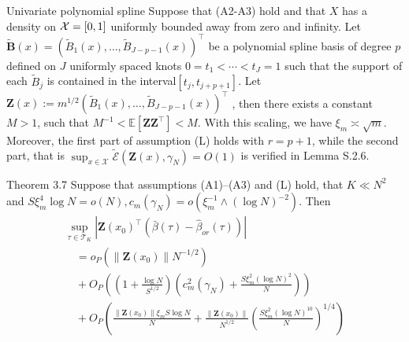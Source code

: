 \documentclass[11pt]{beamer}
\begin{document}
\begin{frame}{Univariate polynomial spline}
Suppose that (A2-A3) hold and that $X$ has a density on $\mathcal{X}=[0,1]$ uniformly bounded away from zero
and infinity. Let $\tilde{\mathbf{B}}(x)=\left(\widetilde{B}_{1}(x), \ldots, \widetilde{B}_{J-p-1}(x)\right)^{\top}$  be a polynomial spline basis
of degree $p$ defined on $J$ uniformly spaced knots $0=t_{1}<\cdots<t_{J}=1$ such
that the support of each $\tilde{B}_j$ is contained in the interval$[t_j,t_{j+p+1}]$. Let $\mathbf{Z}(x):=m^{1 / 2}\left(\widetilde{B}_{1}(x), \ldots, \widetilde{B}_{J-p-1}(x)\right)^{\top}$ , then there exists a constant $M>1$, such that
$M^{-1}<\mathbb{E}\left[\mathbf{Z Z}^{\top}\right]<M$. With this scaling, we have $\xi_{m} \asymp \sqrt{m}$. Moreover, the first part of assumption (L) holds
with $r=p+1$, while the second part, that is $\sup _{x \in \mathcal{X}} \widetilde{\mathcal{E}}\left(\mathbf{Z}(x), \gamma_{N}\right)=O(1)$ is verified in Lemma S.2.6.

\end{frame}


\begin{frame}{Theorem 3.7}
Suppose that assumptions (A1)–(A3) and (L) hold, that $K\ll N^2$ and $S \xi_{m}^{4} \log N=o(N), c_{m}\left(\gamma_{N}\right)=o\left(\xi_{m}^{-1} \wedge(\log N)^{-2}\right)$. Then
$$
\begin{array}{l}
\sup _{\tau \in \mathcal{T}_{K}}\left|\mathbf{Z}\left(x_{0}\right)^{\top}\left(\bar{\beta}(\tau)-\widehat{\beta}_{o r}(\tau)\right)\right| \\
\quad=o_{P}\left(\left\|\mathbf{Z}\left(x_{0}\right)\right\| N^{-1 / 2}\right) \\
\quad+O_{P}\left(\left(1+\frac{\log N}{S^{1 / 2}}\right)\left(c_{m}^{2}\left(\gamma_{N}\right)+\frac{S \xi_{m}^{2}(\log N)^{2}}{N}\right)\right) \\
\quad+O_{P}\left(\frac{\left\|\mathbf{Z}\left(x_{0}\right)\right\| \xi_{m} S \log N}{N}+\frac{\left\|\mathbf{Z}\left(x_{0}\right)\right\|}{N^{1 / 2}}\left(\frac{S \xi_{m}^{2}(\log N)^{10}}{N}\right)^{1 / 4}\right)
\end{array}
$$
\end{frame}
\end{document}
